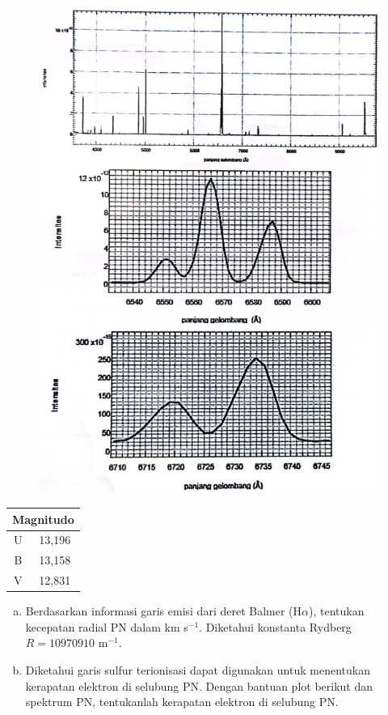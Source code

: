 \documentclass[11pt,fleqn]{exam}
\begin{document}
\begin{questions}
\begin{figure}[ht!]
    \centering
    \includegraphics[scale=0.7]{PN.png}
\end{figure}

\begin{table}[!ht]
\centering
\begin{tabular}{|c|c|}
\hline
\multicolumn{2}{|c|}{Magnitudo}\\ 
\hline
U   & 13,196\\
\hline
B   & 13,158\\
\hline
V   & 12,831\\
\hline
\end{tabular}
\end{table}

\begin{enumerate}[a.]
    \item Berdasarkan informasi garis emisi dari deret Balmer (H$\alpha$), tentukan kecepatan radial PN dalam km s$^{-1}$. Diketahui konstanta Rydberg $R=10970910$ m$^{-1}$.
    \item Diketahui garis sulfur terionisasi dapat digunakan untuk menentukan kerapatan elektron di selubung PN. Dengan bantuan plot berikut dan spektrum PN, tentukanlah kerapatan elektron di selubung PN.


\end{enumerate}
\end{questions}
\end{document}
